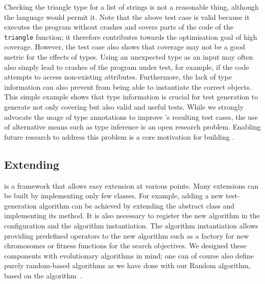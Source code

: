 %
Checking the triangle type for a list of strings
is not a reasonable thing,
although the language would permit it.
%
Note that the above test case is valid
because it executes the program without crashes
and covers parts of the code of the \lstinline[language=python]!triangle!
function;
it therefore contributes towards the optimisation goal of high coverage.
%
However,
the test case also shows that coverage may not be a good metric
for the effects of types.
%
Using an unexpected type as an input
may often also simply lead to crashes of the program under test,
for example,
if the code attempts to access non-existing attributes.
%
Furthermore,
the lack of type information can also prevent \pynguin
from being able to instantiate the correct objects.
%
This simple example shows
that type information is crucial for test generation
to generate not only covering
but also valid and useful tests.
%
While we strongly advocate the usage of type annotations
to improve \pynguin's resulting test cases,
the use of alternative means such as type inference
is an open research problem.
%
Enabling future research to address this problem
is a core motivation for building \pynguin.
%



\subsection{Extending \pynguin}\label{sec:approach-extend}

\Pynguin is a framework
that allows easy extension at various points.
%
Many extensions can be built by implementing
only few classes.
%
For example, adding a new test-generation algorithm
can be achieved by extending the abstract class
and implementing its  method.
%
It is also necessary to register the new algorithm
in the configuration and the algorithm instantiation.
%
The algorithm instantiation allows providing predefined operators
to the new algorithm
such as a factory for new chromosomes
or fitness functions for the search objectives.
%
We designed these components with evolutionary algorithms in mind;
one can of course also define purely random-based algorithms
as we have done with our Random algorithm,
based on the  algorithm~\cite{PLE+07}.
%

%

